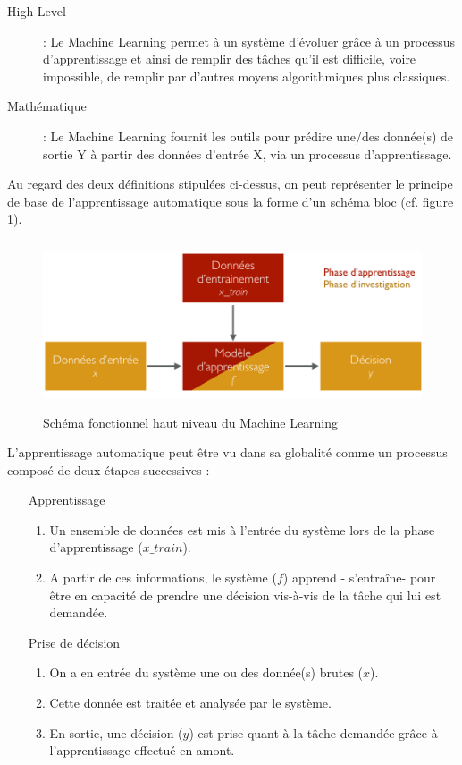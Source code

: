 \begin{description}
	\item[High Level]: Le Machine Learning permet à un système d'évoluer grâce à un processus d'apprentissage et ainsi de remplir des tâches qu'il est difficile, voire impossible, de remplir par d'autres moyens algorithmiques plus classiques. 
	\item[Mathématique]: Le Machine Learning fournit les outils pour prédire une/des donnée(s) de sortie Y à partir des données d'entrée X, via un processus d'apprentissage.
\end{description}
 
Au regard des deux définitions stipulées ci-dessus, on peut représenter le principe de base de l'apprentissage automatique sous la forme d'un schéma bloc (cf. figure \ref{fig:Schéma fonctionnel haut niveau du Machine Learning}).

\begin{figure}[h]
	\centering\includegraphics[height=5cm]{images/ML_high_level.png}
	\caption{Schéma fonctionnel haut niveau du Machine Learning}
	\label{fig:Schéma fonctionnel haut niveau du Machine Learning}
\end{figure}

L'apprentissage automatique peut être vu dans sa globalité comme un processus composé de deux étapes successives : 
\begin{enumerate}
		\item [Apprentissage]
		 \begin{enumerate}
			\item  Un ensemble de données est mis à l'entrée du système lors de la phase d'apprentissage ($x\_train$).
			\item A partir de ces informations, le système ($f$) apprend - s'entraîne- pour être en capacité de prendre une décision vis-à-vis de la tâche qui lui est demandée. 
		\end{enumerate}
		
		\item [Prise de décision] 
		\begin{enumerate}
			\item  On a en entrée du système une ou des donnée(s) brutes ($x$).  
			\item Cette donnée est traitée et analysée par le système.
			\item En sortie, une décision ($y$) est prise quant à la tâche demandée grâce à l'apprentissage effectué en amont. 
		\end{enumerate}
\end{enumerate}


